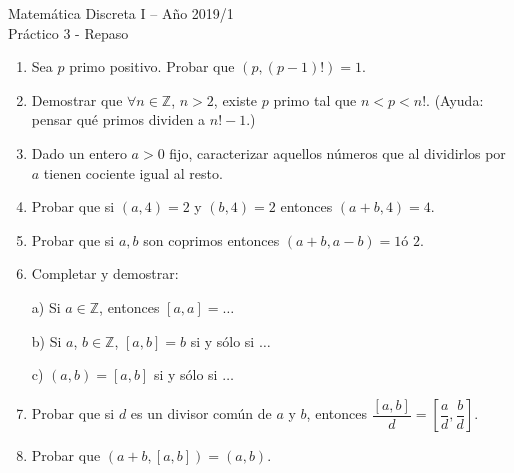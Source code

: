 \documentclass[12pt,spanish,makeidx]{amsbook}
\begin{document}
{\bf \begin{center} Matemática Discreta I -- Año 2019/1 \\Práctico 3 - Repaso\end{center}}


\smallskip

\begin{enumerate}




\item Sea $p$ primo positivo. Probar que $(p,(p-1)!)=1$.

\smallskip

\item Demostrar que $\forall n\in{\mathbb Z}$, $n>2$, existe $p$ primo tal que $n<p<n!$. (Ayuda: pensar qu\'e primos dividen a $n! - 1$.)



\smallskip

\item Dado un entero $a>0$ fijo, caracterizar aquellos n\'umeros que al dividirlos por $a$ tienen cociente igual al resto.

\smallskip


\item Probar que si $(a,4)=2$ y $(b,4)=2$ entonces $(a+b,4)=4$.

\smallskip
\item Probar que si $a,b$ son coprimos entonces $(a+b,a-b)=1 \text{
\'o } 2 $.



\smallskip



\item Completar y demostrar:

a) Si $a \in {\mathbb Z}$, entonces $[a,a]=\dots$

b) Si $a$, $b \in {\mathbb Z}$, $[a,b]=b$ si y s\'olo si $\ldots$

c) $(a,b)=[a,b]$ si y s\'olo si $\ldots$


\smallskip

\item Probar que si $d$ es un divisor com\'un de $a$ y $b$, entonces $\dfrac{[a,b]}{d} = \left[\dfrac{a}{d},\dfrac{b}{d}\right]$.



\smallskip

\item Probar que $(a+b,[a,b])=(a,b)$. %


\end{enumerate}
\end{document}
